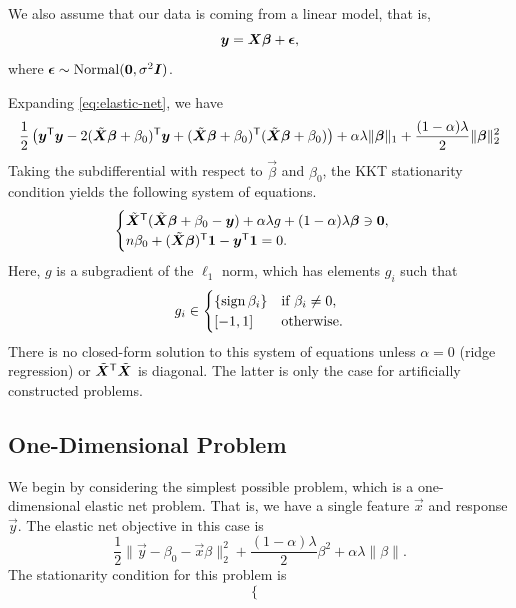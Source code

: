We also assume that our data is coming from a linear model, that is,
\[
  \vec y = \mat X\vec\beta + \vec\epsilon,
\]
where \(\vec\epsilon \sim \normal(\vec 0, \sigma^2\mat I)\).

Expanding \eqref{eq:elastic-net}, we have
\[
  \begin{aligned}
    \frac{1}{2}\left( \vec y^\T \vec y - 2(\tilde{\mat{X}}\vec{\beta} + \beta_0)^\T\vec{y} + (\tilde{\mat{X}}\vec{\beta} + \beta_0)^\T(\tilde{\mat{X}}\vec{\beta} + \beta_0)\right) + \alpha\lambda \lVert \vec\beta \rVert_1 + \frac{(1 - \alpha)\lambda}{2}\lVert \vec \beta \rVert_2^2 \\
  \end{aligned}
\]
Taking the subdifferential with respect to \(\vec{\beta}\) and \(\beta_0\), the KKT stationarity condition yields the following system of equations.
\[
  \begin{cases}
    \tilde{\mat{X}}^\T(\tilde{\mat{X}}\vec{\beta} + \beta_0 - \vec{y}) + \alpha\lambda g + (1 - \alpha)\lambda \vec\beta \ni \vec{0}, \\
    n \beta_0 + (\tilde{\mat{X}}\vec{\beta})^\T \vec{1} - \vec{y}^\T \vec{1} = 0.
  \end{cases}
\]
Here, \(g\) is a subgradient of the \(\ell_1\) norm, which has elements \(g_i\) such that
\[
  g_i \in
  \begin{cases}
    \{\operatorname{sign}{\beta_i}\} & \text{if } \beta_i \neq 0, \\
    [-1, 1]            & \text{otherwise}.
  \end{cases}
\]
There is no closed-form solution to this system of equations unless \(\alpha = 0\) (ridge regression) or \(\tilde{\mat{X}}^\T\tilde{\mat{X}}\) is diagonal. The latter is only the case for artificially constructed problems.

\subsection{One-Dimensional Problem}

We begin by considering the simplest possible problem, which is a one-dimensional elastic net problem. That is, we have a single feature \(\vec{x}\) and response \(\vec{y}\). The elastic net objective in this case is
\[
  \frac 1 2 \lVert \vec{y} - \beta_0 - \vec{x} \beta \rVert_2^2 + \frac{(1 - \alpha)\lambda}{2}\beta^2 + \alpha\lambda \lVert \beta \rVert .
\]
The stationarity condition for this problem is
\[
  \begin{cases}

  \end{cases}
\]


